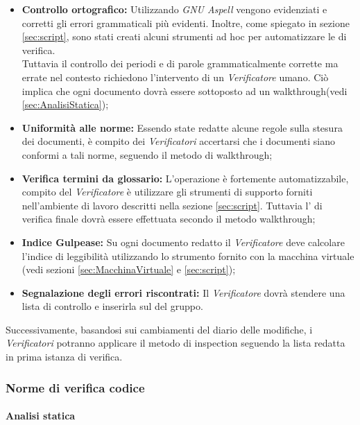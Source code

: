 \documentclass{scalatekids-article}
\begin{document}
\begin{itemize}
    \item\textbf{Controllo ortografico:} Utilizzando \textit{GNU Aspell} vengono evidenziati e corretti
        gli errori grammaticali più evidenti. Inoltre, come spiegato in sezione \ref{sec:script}, sono stati
        creati alcuni strumenti ad hoc per automatizzare le  di verifica.\\
        Tuttavia il controllo dei periodi e di parole grammaticalmente corrette ma errate nel contesto richiedono
        l'intervento di un \textit{Verificatore} umano. Ciò implica che ogni documento dovrà essere sottoposto ad un walkthrough(vedi \ref{sec:AnalisiStatica});
    \item\textbf{Uniformità alle norme:} Essendo state redatte alcune regole sulla stesura dei documenti, è compito dei \textit{Verificatori}
        accertarsi che i documenti siano conformi a tali norme, seguendo il metodo di walkthrough;
    \item\textbf{Verifica termini da glossario:} L'operazione è fortemente automatizzabile, compito del \textit{Verificatore} è utilizzare gli strumenti di supporto
        forniti nell'ambiente di lavoro descritti nella sezione \ref{sec:script}. Tuttavia l' di verifica finale dovrà essere effettuata secondo il metodo
        walkthrough;
    \item\textbf{Indice Gulpease:} Su ogni documento redatto il \textit{Verificatore} deve calcolare l'indice di leggibilità utilizzando lo strumento fornito
        con la macchina virtuale (vedi sezioni \ref{sec:MacchinaVirtuale} e \ref{sec:script});
    \item\textbf{Segnalazione degli errori riscontrati:} Il \textit{Verificatore} dovrà stendere una lista di controllo e inserirla sul  del gruppo.
\end{itemize}
Successivamente, basandosi sui cambiamenti del diario delle modifiche, i
\textit{Verificatori} potranno applicare il metodo di inspection seguendo la
lista redatta in prima istanza di verifica.

\subsubsection{Norme di verifica codice}

\paragraph{Analisi statica}
\end{document}
